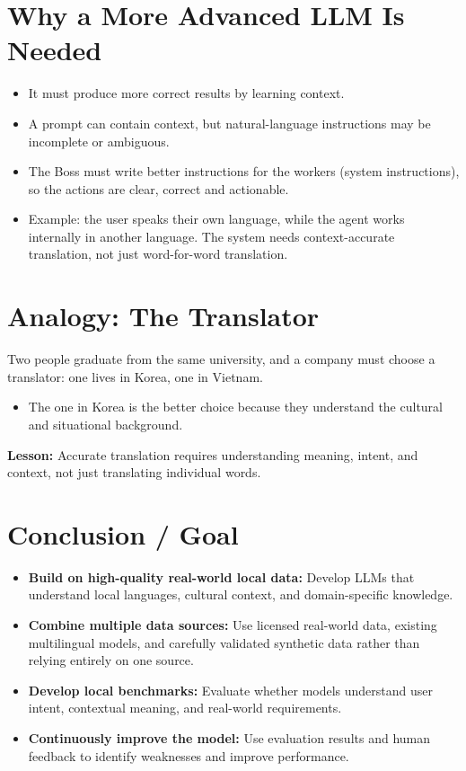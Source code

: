 \documentclass[a4paper,12pt]{report}
\begin{document}
\section{Why a More Advanced LLM Is Needed}

\begin{itemize}
    \item It must produce more correct results by learning context.
    \item A prompt can contain context, but natural-language instructions may be incomplete or ambiguous.
    \item The Boss must write better instructions for the workers (system instructions), so the actions are clear, correct and actionable.
    \item Example: the user speaks their own language, while the agent works internally in another language. The system needs context-accurate translation, not just word-for-word translation.
\end{itemize}

\section{Analogy: The Translator}

Two people graduate from the same university, and a company must choose a translator: one lives in Korea, one in Vietnam.

\begin{itemize}
    \item The one in Korea is the better choice because they understand the cultural and situational background.
\end{itemize}

\noindent\textbf{Lesson:} Accurate translation requires understanding meaning, intent, and context, not just translating individual words.

\section{Conclusion / Goal}

\begin{itemize}
    \item \textbf{Build on high-quality real-world local data:} Develop LLMs that understand local languages, cultural context, and domain-specific knowledge.
    
    \item \textbf{Combine multiple data sources:} Use licensed real-world data, existing multilingual models, and carefully validated synthetic data rather than relying entirely on one source.
    
    \item \textbf{Develop local benchmarks:} Evaluate whether models understand user intent, contextual meaning, and real-world requirements.
    
    \item \textbf{Continuously improve the model:} Use evaluation results and human feedback to identify weaknesses and improve performance.
\end{itemize}
\end{document}
